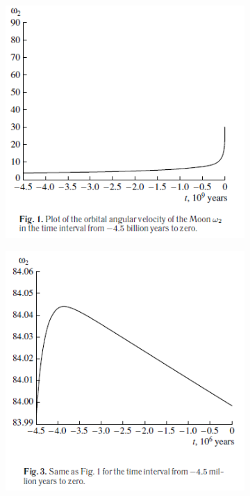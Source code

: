 \documentclass[fontsize = 11pt,a4paper]{article}
\begin{document}
\begin{figure}[h!]
  \begin{subfigure}[t]{0.4\linewidth}
    \includegraphics[width=\linewidth]{graph1.png}
  \end{subfigure}
  \begin{subfigure}[t]{0.4\linewidth}
    \includegraphics[width=\linewidth]{graph3.png}

\end{subfigure}
\end{figure}
\end{document}
